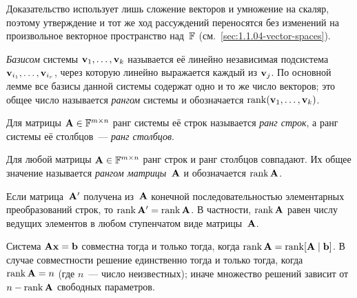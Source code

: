 \begin{remark}
\label{rem:main-lemma-abstract}
Доказательство использует лишь сложение векторов и умножение на скаляр,
поэтому утверждение и тот же ход рассуждений переносятся без изменений
на произвольное векторное пространство над~$\mathbb{F}$ (см.~\cref{sec:1.1.04-vector-spaces}).
\end{remark}

\begin{definition}
\label{def:basis-rank-system}
\emph{Базисом} системы $\mathbf{v}_1, \dots, \mathbf{v}_k$ называется её
линейно независимая подсистема $\mathbf{v}_{i_1}, \dots, \mathbf{v}_{i_r}$,
через которую линейно выражается каждый из $\mathbf{v}_j$. По основной
лемме все базисы данной системы содержат одно и то же число векторов;
это общее число называется \emph{рангом} системы и обозначается
$\operatorname{rank}(\mathbf{v}_1, \dots, \mathbf{v}_k)$.
\end{definition}

Для матрицы $\mathbf{A} \in \mathbb{F}^{m \times n}$ ранг системы её строк
называется \emph{ранг строк}, а ранг системы её столбцов~--- \emph{ранг
столбцов}.

\begin{theorem}
\label{thm:rank-row-col}
Для любой матрицы $\mathbf{A} \in \mathbb{F}^{m \times n}$ ранг строк и ранг
столбцов совпадают. Их общее значение называется \emph{рангом
матрицы}~$\mathbf{A}$ и обозначается $\operatorname{rank} \mathbf{A}$.
\end{theorem}

\begin{proposition}
\label{prop:rank-ero-invariance}
Если матрица~$\mathbf{A}'$ получена из~$\mathbf{A}$ конечной
последовательностью элементарных преобразований строк, то
$\operatorname{rank} \mathbf{A}' = \operatorname{rank} \mathbf{A}$. В частности, $\operatorname{rank} \mathbf{A}$ равен
числу ведущих элементов в любом ступенчатом виде матрицы~$\mathbf{A}$.
\end{proposition}

\begin{theorem}
\label{thm:kronecker-capelli}
Система $\mathbf{A}\mathbf{x} = \mathbf{b}$ совместна тогда и только тогда,
когда $\operatorname{rank} \mathbf{A} = \operatorname{rank} [\mathbf{A} \mid \mathbf{b}]$. В случае
совместности решение единственно тогда и только тогда, когда
$\operatorname{rank} \mathbf{A} = n$ (где $n$~--- число неизвестных); иначе множество
решений зависит от $n - \operatorname{rank} \mathbf{A}$ свободных параметров.
\end{theorem}

